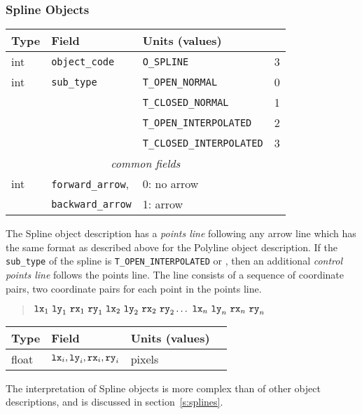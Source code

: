 \subsubsection{Spline Objects}
%
\begin{center}
\begin{tabular} {|l|l|ll|}
\hline
Type	& Field			& Units (values)		&	\\ \hline
\hline
%
int	& {\tt object\_code}	& {\tt O\_SPLINE}		& 3	\\ \hline
%
int	& {\tt sub\_type}	& {\tt T\_OPEN\_NORMAL}		& 0	\\
	&			& {\tt T\_CLOSED\_NORMAL} 	& 1	\\
	&			& {\tt T\_OPEN\_INTERPOLATED}	& 2	\\
	&			& {\tt T\_CLOSED\_INTERPOLATED}	& 3	\\ \hline
%
\multicolumn{4}{c}{\it common fields}					\\ \hline
%
int	& {\tt forward\_arrow},	& 0: no arrow			&	\\
	& {\tt backward\_arrow}	& 1: arrow			&	\\ \hline
\end{tabular}
\end{center}
%
The Spline object description has a {\em points line} following
	any arrow line which has the same format as described above
	for the Polyline object description.
If the {\tt sub\_type} of the spline is	{\tt T\_OPEN\_INTERPOLATED} or
	, then an additional
	{\em control points line} follows the points line.
The line consists of a sequence of coordinate pairs, two coordinate pairs
	for each point in the points line.
%
\begin{quote}
$
	{\tt lx}_1 ~{\tt ly}_1 ~{\tt rx}_1 ~{\tt ry}_1
	~{\tt lx}_2 ~{\tt ly}_2 ~{\tt rx}_2 ~{\tt ry}_2
	\ldots
	~{\tt lx}_n ~{\tt ly}_n ~{\tt rx}_n ~{\tt ry}_n
$
\end{quote}
%
\begin{center}
\begin{tabular} {|l|l|ll|}
\hline
Type	& Field			& Units (values)	&	\\ \hline
\hline
%
float	& ${\tt lx}_i,{\tt ly}_i,
	   {\tt rx}_i,{\tt ry}_i$& pixels		&	\\ \hline
\end{tabular}
\end{center}
%
The interpretation of Spline objects is more complex than of other
	object descriptions, and is discussed in section~\ref{s:splines}.

